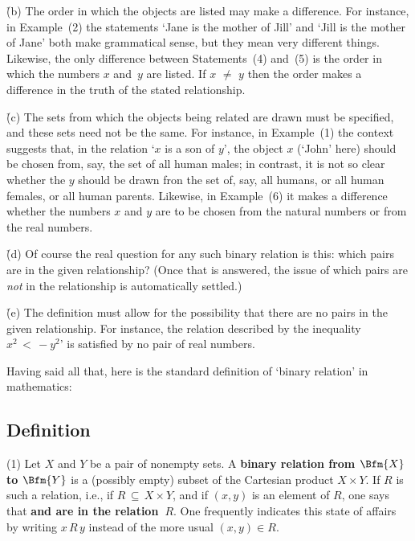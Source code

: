 {        \h (b) The order in which the objects are listed may make a difference. For instance, in Example~(2)
    the statements `Jane is the mother of Jill' and `Jill is the mother of Jane' both make grammatical sense, but they mean very different things.
    Likewise, the only difference between Statements~(4) and~(5) is the order in which the numbers $x$ and~$y$ are listed.
    If  $x \,\,{\neq}\,\, y$ then the order makes a difference in the truth of the stated relationship.

        \h (c) The sets from which the objects being related are drawn must be specified, and these sets need not be the same.
    For instance, in Example~(1) the context suggests that, in the relation `$x$ is a son of $y$',
    the object $x$ (`John' here) should be chosen from, say, the set of all human males;
    in contrast, it is not so clear whether the $y$ should be drawn fron the set of, say, all humans, or all human females, or all human parents.
    Likewise, in Example~(6) it makes a difference whether the numbers $x$ and $y$ are to be chosen from the natural numbers or from the real numbers.

        \h (d) Of course the real question for any such binary relation is this: which pairs are in the given relationship?
    (Once that is answered, the issue of which pairs are {\em not} in the relationship is automatically settled.)

        \h (e) The definition must allow for the possibility that there are no pairs in the given relationship.
    For instance, the relation described by the inequality $x^{2}\,<\,-y^{2}$' is satisfied by no pair of real numbers.

        Having said all that, here is the standard definition of `binary relation' in mathematics:

\V

        \subsection{\small{{\bf Definition}}}
        \label{DefA12.60}

\V

        (1) Let $X$ and $Y$ be a pair of nonempty sets.
    A {\bf binary relation from $\Bfm{X}$ to $\Bfm{Y}$} is a (possibly empty) subset of the Cartesian product $X{\times}Y$.
    If $R$ is such a relation, i.e., if $R \,{\subseteq}\, X{\times}Y$, and if $(x,y)$ is an element of $R$, one says that {\bf {} and  are in the  relation~$R$}.
    One frequently indicates this state of affairs by writing $x\,R\,y$ instead of the more usual $(x,y){\in}R$.

}

